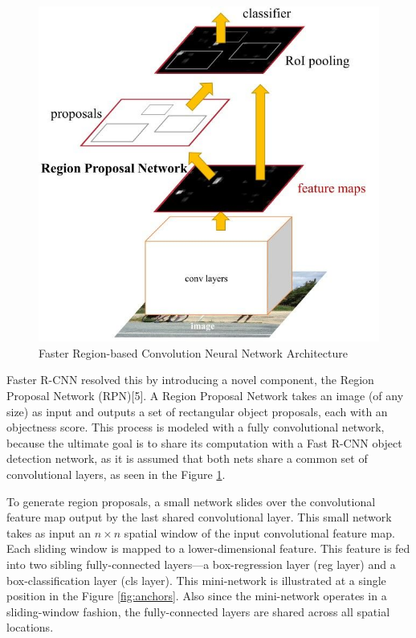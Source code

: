 \begin{figure}[h!]
    \centering
    \includegraphics[scale=0.4]{Figures/faster-rcnn.jpeg}
    \caption{Faster Region-based Convolution Neural Network Architecture}
    \label{fig:faster-rcnn}
\end{figure}

Faster R-CNN resolved this by introducing a novel component, the Region Proposal Network (RPN)[5]. A Region Proposal Network takes an image
(of any size) as input and outputs a set of rectangular object proposals, each with an objectness score. This process is modeled with a fully 
convolutional network, because the ultimate goal is to share its computation with a Fast R-CNN object detection network, as it is assumed that 
both nets share a common set of convolutional layers, as seen in the Figure \ref{fig:faster-rcnn}.


To generate region proposals, a small network slides over the convolutional feature map output by the last shared convolutional layer. This small
network takes as input an $n \times n$ spatial window of the input convolutional feature map. Each sliding window is mapped to a lower-dimensional feature.
This feature is fed into two sibling fully-connected layers—a box-regression layer (reg layer) and a box-classification layer (cls layer). This mini-network 
is illustrated at a single position in the Figure \ref{fig:anchors}. Also since the mini-network operates in a sliding-window fashion, the 
fully-connected layers are shared across all spatial locations. 

